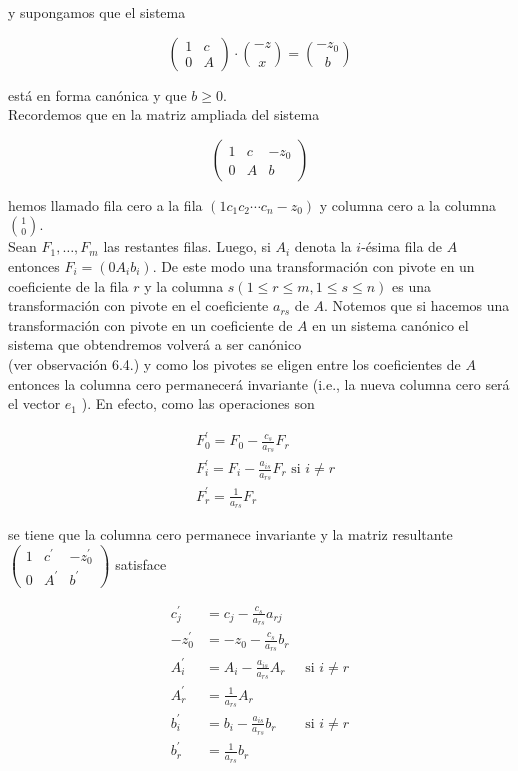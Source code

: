 \documentclass[10pt]{article}
\begin{document}
y supongamos que el sistema

$$
\left(\begin{array}{cc}
1 & c \\
0 & A
\end{array}\right) \cdot\binom{-z}{x}=\binom{-z_{0}}{b}
$$

está en forma canónica y que $b \geq 0$.\\
Recordemos que en la matriz ampliada del sistema

$$
\left(\begin{array}{cc|c}
1 & c & -z_{0} \\
0 & A & b
\end{array}\right)
$$

hemos llamado fila cero a la fila $\left(1 c_{1} c_{2} \cdots c_{n}-z_{0}\right)$ y columna cero a la columna $\binom{1}{0}$.\\
Sean $F_{1}, \ldots, F_{m}$ las restantes filas. Luego, si $A_{i}$ denota la $i$-ésima fila de $A$ entonces $F_{i}=\left(0 A_{i} b_{i}\right)$. De este modo una transformación con pivote en un coeficiente de la fila $r$ y la columna $s(1 \leq r \leq m, 1 \leq s \leq n)$ es una transformación con pivote en el coeficiente $a_{r s}$ de $A$. Notemos que si hacemos una transformación con pivote en un coeficiente de $A$ en un sistema canónico el sistema que obtendremos volverá a ser canónico\\
(ver observación 6.4.) y como los pivotes se eligen entre los coeficientes de $A$ entonces la columna cero permanecerá invariante (i.e., la nueva columna cero será el vector $e_{1}$ ). En efecto, como las operaciones son

$$
\begin{aligned}
& F_{0}^{\prime}=F_{0}-\frac{c_{s}}{a_{r s}} F_{r} \\
& F_{i}^{\prime}=F_{i}-\frac{a_{i s}}{a_{r s}} F_{r} \text { si } i \neq r \\
& F_{r}^{\prime}=\frac{1}{a_{r s}} F_{r}
\end{aligned}
$$

se tiene que la columna cero permanece invariante y la matriz resultante $\left(\begin{array}{cc|c}1 & c^{\prime} & -z_{0}^{\prime} \\ 0 & A^{\prime} & b^{\prime}\end{array}\right)$ satisface

$$
\begin{array}{rlr}
c_{j}^{\prime} & =c_{j}-\frac{c_{s}}{a_{r s}} a_{r j} & \\
-z_{0}^{\prime} & =-z_{0}-\frac{c_{s}}{a_{r s}} b_{r} & \\
A_{i}^{\prime} & =A_{i}-\frac{a_{i s}}{a_{r s}} A_{r} & \text { si } i \neq r \\
A_{r}^{\prime} & =\frac{1}{a_{r s}} A_{r} & \\
b_{i}^{\prime} & =b_{i}-\frac{a_{i s}}{a_{r s}} b_{r} & \text { si } i \neq r \\
b_{r}^{\prime} & =\frac{1}{a_{r s}} b_{r} &
\end{array}
$$
\end{document}
